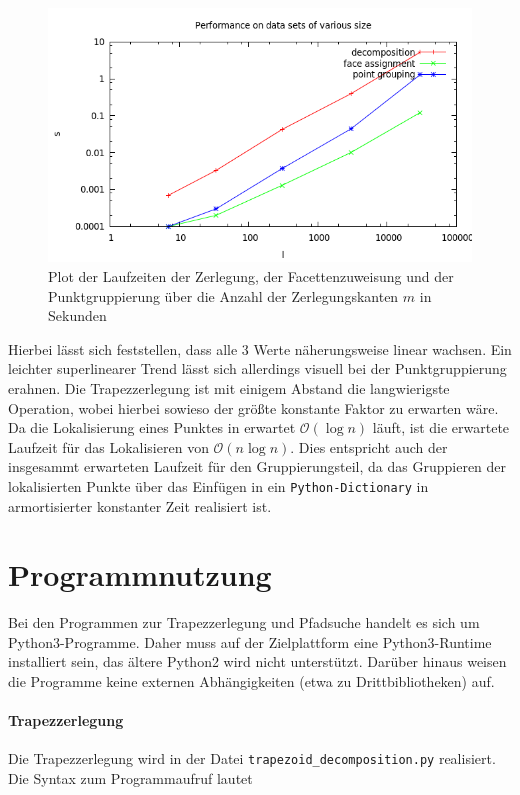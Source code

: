 \documentclass[11pt, a4paper]{article}
\begin{document}
\begin{figure}[h!]
	\centering
	\includegraphics[width=\textwidth]{performance}
	\caption{Plot der Laufzeiten der Zerlegung, der Facettenzuweisung und der Punktgruppierung über die Anzahl der Zerlegungskanten $m$ in Sekunden}
	\label{fig:performance_plot}
\end{figure}

Hierbei lässt sich feststellen, dass alle 3 Werte näherungsweise linear wachsen. Ein leichter superlinearer Trend lässt sich allerdings visuell bei der Punktgruppierung erahnen. Die Trapezzerlegung ist mit einigem Abstand die langwierigste Operation, wobei hierbei sowieso der größte konstante Faktor zu erwarten wäre. Da die Lokalisierung eines Punktes in erwartet $\mathcal{O}(\log n)$ läuft, ist die erwartete Laufzeit für das Lokalisieren von $\mathcal{O}(n \log n)$. Dies entspricht auch der insgesammt erwarteten Laufzeit für den Gruppierungsteil, da das Gruppieren der lokalisierten Punkte über das Einfügen in ein \texttt{Python-Dictionary} in armortisierter konstanter Zeit realisiert ist.

\section{Programmnutzung}
Bei den Programmen zur Trapezzerlegung und Pfadsuche handelt es sich um Python3-Programme. Daher muss auf der Zielplattform eine Python3-Runtime installiert sein, das ältere Python2 wird nicht unterstützt. Darüber hinaus weisen die Programme keine externen Abhängigkeiten (etwa zu Drittbibliotheken) auf.

\paragraph{Trapezzerlegung} Die Trapezzerlegung wird in der Datei \texttt{trapezoid\_decomposition.py} realisiert. Die Syntax zum Programmaufruf lautet
\end{document}

